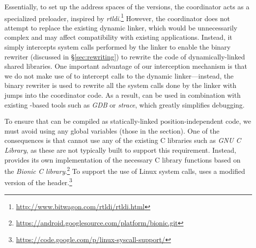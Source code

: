 
  Essentially, to set up the address spaces of
the versions, the coordinator acts as a specialized preloader, inspired
by
\emph{rtldi}.\footnote{\url{http://www.bitwagon.com/rtldi/rtldi.html}}
However, the coordinator does not attempt to replace the existing
dynamic linker, which would be unnecessarily complex and may affect
compatibility with existing applications. Instead, it simply intercepts
system calls performed by the linker to enable the binary rewriter
(discussed in \S\ref{sec:rewriting}) to rewrite the code of
dynamically-linked shared libraries.  One important advantage of our
interception mechanism is that we do not make use of \ptrace to
intercept calls to the dynamic linker---instead, the binary rewriter is
used to rewrite all the system calls done by the linker with jumps into
the coordinator code.  As a result, \vx can be used in combination with
existing -based tools such as \textit{GDB} or
\textit{strace}, which greatly simplifies debugging.




 To ensure that \vx can be compiled as
statically-linked position-independent code, we must avoid using any
global variables (\ie those in the  section). One of the
consequences is that \vx cannot use any of the existing C libraries such
as \textit{GNU C Library}, as these are not typically built to support
this requirement.  Instead, \vx provides its own implementation of the
necessary C library functions based on the \textit{Bionic C
library}.\footnote{\url{https://android.googlesource.com/platform/bionic.git}}
To support the use of Linux system calls, \vx uses a modified version of
the 
header.\footnote{\url{https://code.google.com/p/linux-syscall-support/}}



